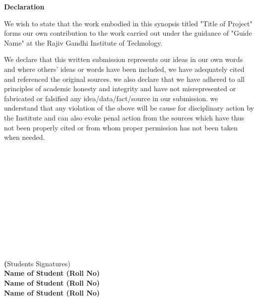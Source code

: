 \newpage
\thispagestyle{empty}
\vspace*{0.2cm}
\vspace{1cm}
\begin{center}
 \large\textbf{Declaration}
\end{center}
\vspace{1.5cm}

We wish to state that the work embodied in this synopsis titled "Title of Project" forms our own contribution to the work carried out under the guidance of "Guide Name" at the Rajiv Gandhi Institute of Technology.\par We declare that this written submission represents our ideas in our own words and where others' ideas or words have been included, we have adequately cited and referenced the original sources. we also declare that we have adhered to all principles of academic honesty and integrity and have not misrepresented or fabricated or falsified any idea/data/fact/source in our submission. we understand that any violation of the above will be cause for disciplinary action by the Institute and can also evoke penal action from the sources which have thus not been properly cited or from whom proper permission has not been taken when needed.
\\
\\
\\
\\
\\
\\
\\
\\
\\ 
\\
\\
\\
\\
\textbf(Students Signatures)\\
\hspace{1 mm} \textbf{Name of Student (Roll No)}\\
\hspace{1 mm} \textbf{Name of Student (Roll No)}\\
\hspace{1 mm} \textbf{Name of Student (Roll No)}\\

\newpage

